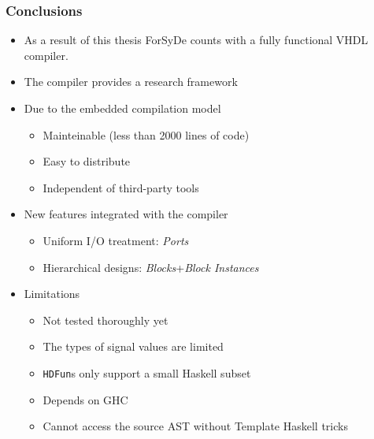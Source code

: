 \documentclass{beamer}
\begin{document}
\beamerdefaultoverlayspecification{}
\begin{frame}
  \frametitle{Conclusions}
  \begin{itemize}
    
  \item As a result of this thesis ForSyDe counts with a fully
    functional VHDL compiler.
  \pause
  \item The compiler provides a research framework
  \pause
  \item Due to the embedded compilation model
    \begin{itemize}
      \item Mainteinable (less than 2000 lines of code)
      \item Easy to distribute
      \item Independent of third-party tools
    \end{itemize}
  \pause
  \item New features integrated with the compiler
    \begin{itemize}
      \item Uniform I/O treatment: \textit{Ports}
      \item Hierarchical designs: \textit{Blocks}+\textit{Block Instances}
    \end{itemize}
    \pause
    \item Limitations
      \begin{itemize}
      \item Not tested thoroughly yet
      \item The types of signal values are limited
      \item \texttt{HDFun}s only support a small Haskell subset
      \item Depends on GHC
      \item Cannot access the source AST without Template Haskell tricks
      \end{itemize}
  \end{itemize}  
\end{frame}
\end{document}
